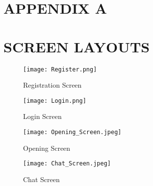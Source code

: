 \chapter{APPENDIX A}


\chapter{SCREEN LAYOUTS}

\begin{figure}[ht]
  \centering
  \texttt{[image: Register.png]}
  \caption{Registration Screen}\label{fig:register}
\end{figure}

\begin{figure}[ht]
  \centering
  \texttt{[image: Login.png]}
  \caption{Login Screen}\label{fig:login}
\end{figure}


\begin{figure}[ht]
  \centering
  \texttt{[image: Opening\_Screen.jpeg]}
  \caption{Opening Screen}\label{fig:opening_screen}
\end{figure}

\begin{figure}[ht]
  \centering
  \texttt{[image: Chat\_Screen.jpeg]}
  \caption{Chat Screen}\label{fig:chat_screen}
\end{figure}
